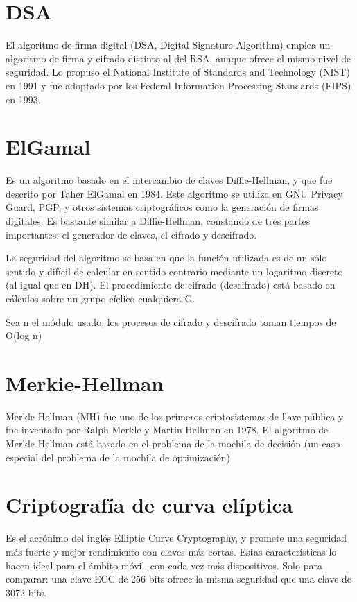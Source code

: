 \documentclass{article}
\begin{document}
\section{DSA}
El algoritmo de firma digital (DSA, Digital Signature Algorithm) emplea un algoritmo de firma y cifrado distinto al del RSA, aunque ofrece el mismo nivel de seguridad. Lo propuso el National Institute of Standards and Technology (NIST) en 1991 y fue adoptado por los Federal Information Processing Standards (FIPS) en 1993.



\section{ElGamal}
Es un algoritmo basado en el intercambio de claves Diffie-Hellman, y que fue descrito por Taher ElGamal en 1984. Este algoritmo se utiliza en GNU Privacy Guard, PGP, y otros sistemas criptográficos como la generación de firmas digitales. Es bastante similar a Diffie-Hellman, constando de tres partes importantes: el generador de claves, el cifrado y descifrado.

La seguridad del algoritmo se basa en que la función utilizada es de un sólo sentido y difícil de calcular en sentido contrario mediante un logaritmo discreto (al igual que en DH). El procedimiento de cifrado (descifrado) está basado en cálculos sobre un grupo cíclico cualquiera G.

Sea n el módulo usado, los procesos de cifrado y descifrado toman tiempos de O(log n)



\section{Merkie-Hellman}
Merkle-Hellman (MH) fue uno de los primeros criptosistemas de llave pública y fue inventado por Ralph Merkle y Martin Hellman en 1978.
El algoritmo de Merkle-Hellman está basado en el problema de la mochila de decisión (un caso especial del problema de la mochila de optimización)

\section{Criptografía de curva elíptica}
Es el acrónimo del inglés Elliptic Curve Cryptography, y promete una seguridad más fuerte y mejor rendimiento con claves más cortas. Estas características lo hacen ideal para el ámbito móvil, con cada vez más dispositivos.
Solo para comparar: una clave ECC de 256 bits ofrece la misma seguridad que una clave de 3072 bits.
\end{document}
